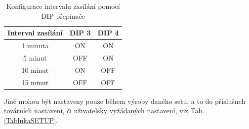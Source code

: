\newpage{}

\begin{table}[!ht]
\centering
\caption{Konfigurace intervalu zasílání pomocí DIP přepínače \cite{WeptechCidlo}}
\label{TablukaDIP}
\begin{tabular}{|c|c|c|}
\hline
\textbf{Interval zasílání} & DIP 3 & DIP 4 \\ \hline
1 minuta & ON & ON \\ \hline
5 minut & OFF & ON \\ \hline
10 minut & ON & OFF \\ \hline
15 minut & OFF & OFF \\ \hline
\end{tabular}
\end{table}

Jiné mohou být nastaveny pouze během výroby daného setu, a to do příslušnch továrních nastavení, či uživatelsky vyžádaných nastavení, viz Tab. \ref{TablukaSETUP}.

